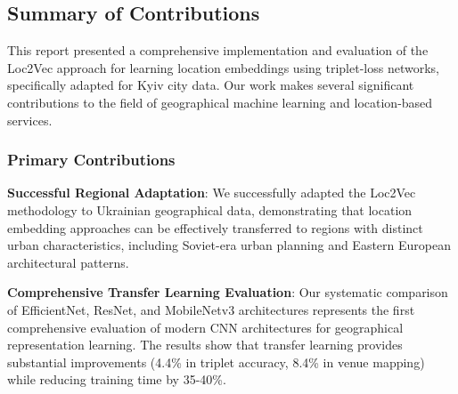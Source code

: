 \subsection{Summary of Contributions}

This report presented a comprehensive implementation and evaluation of the Loc2Vec approach for learning location embeddings using triplet-loss networks, specifically adapted for Kyiv city data. Our work makes several significant contributions to the field of geographical machine learning and location-based services.

\subsubsection{Primary Contributions}

\textbf{Successful Regional Adaptation}: We successfully adapted the Loc2Vec methodology to Ukrainian geographical data, demonstrating that location embedding approaches can be effectively transferred to regions with distinct urban characteristics, including Soviet-era urban planning and Eastern European architectural patterns.

\textbf{Comprehensive Transfer Learning Evaluation}: Our systematic comparison of EfficientNet, ResNet, and MobileNetv3 architectures represents the first comprehensive evaluation of modern CNN architectures for geographical representation learning. The results show that transfer learning provides substantial improvements (4.4\% in triplet accuracy, 8.4\% in venue mapping) while reducing training time by 35-40\%.

